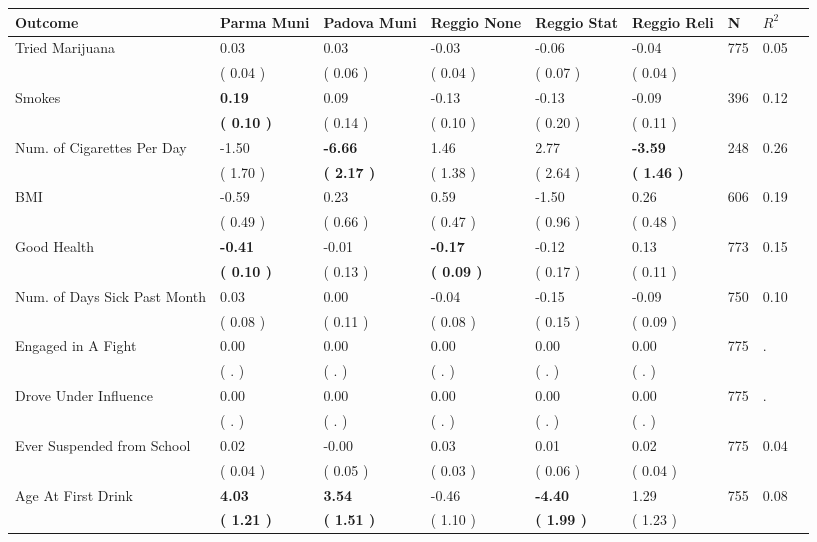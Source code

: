 \begin{tabular}{L{6.2cm} C{1.8cm} C{1.8cm} C{1.8cm} C{1.8cm} C{1.8cm} C{1.8cm} C{0.3cm} C{0.3cm}}
\toprule
 \textbf{Outcome} & \textbf{Parma Muni} & \textbf{Padova Muni} & \textbf{Reggio None} & \textbf{Reggio Stat} & \textbf{Reggio Reli} & \textbf{N} & \textbf{$ R^2$} \\
\midrule
Tried Marijuana &      0.03 &      0.03 &     -0.03 &     -0.06 &     -0.04  & 775 &       0.05 \\ 
 & (     0.04 ) & (     0.06 ) & (     0.04 ) & (     0.07 ) & (     0.04 )  & \\
Smokes & \textbf{     0.19} &      0.09 &     -0.13 &     -0.13 &     -0.09  & 396 &       0.12 \\ 
 & \textbf{(     0.10 )} & (     0.14 ) & (     0.10 ) & (     0.20 ) & (     0.11 )  & \\
Num. of Cigarettes Per Day &     -1.50 & \textbf{    -6.66} &      1.46 &      2.77 & \textbf{    -3.59}  & 248 &       0.26 \\ 
 & (     1.70 ) & \textbf{(     2.17 )} & (     1.38 ) & (     2.64 ) & \textbf{(     1.46 )}  & \\
BMI &     -0.59 &      0.23 &      0.59 &     -1.50 &      0.26  & 606 &       0.19 \\ 
 & (     0.49 ) & (     0.66 ) & (     0.47 ) & (     0.96 ) & (     0.48 )  & \\
Good Health & \textbf{    -0.41} &     -0.01 & \textbf{    -0.17} &     -0.12 &      0.13  & 773 &       0.15 \\ 
 & \textbf{(     0.10 )} & (     0.13 ) & \textbf{(     0.09 )} & (     0.17 ) & (     0.11 )  & \\
Num. of Days Sick Past Month &      0.03 &      0.00 &     -0.04 &     -0.15 &     -0.09  & 750 &       0.10 \\ 
 & (     0.08 ) & (     0.11 ) & (     0.08 ) & (     0.15 ) & (     0.09 )  & \\
Engaged in A Fight &      0.00 &      0.00 &      0.00 &      0.00 &      0.00  & 775 &          . \\ 
 & (        . ) & (        . ) & (        . ) & (        . ) & (        . )  & \\
Drove Under Influence &      0.00 &      0.00 &      0.00 &      0.00 &      0.00  & 775 &          . \\ 
 & (        . ) & (        . ) & (        . ) & (        . ) & (        . )  & \\
Ever Suspended from School &      0.02 &     -0.00 &      0.03 &      0.01 &      0.02  & 775 &       0.04 \\ 
 & (     0.04 ) & (     0.05 ) & (     0.03 ) & (     0.06 ) & (     0.04 )  & \\
Age At First Drink & \textbf{     4.03} & \textbf{     3.54} &     -0.46 & \textbf{    -4.40} &      1.29  & 755 &       0.08 \\ 
 & \textbf{(     1.21 )} & \textbf{(     1.51 )} & (     1.10 ) & \textbf{(     1.99 )} & (     1.23 )  & \\
\bottomrule
\end{tabular}
